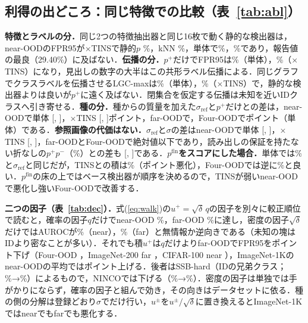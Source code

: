 \documentclass[MIRU,submit]{miru2025j}
\newcommand\eqnref[1]{式(\ref{eq:#1})}
\newcommand\AUC{AUROC}
\newcommand\FPR{FPR95}
\newcommand\pP{p^{+}}
\newcommand\pN{p^{-}}
\newcommand\pfin{p^{\mathrm{fin}}}
\newcommand\sR{\sigma_{\mathrm{ref}}}
\begin{document}
\subsection{利得の出どころ：同じ特徴での比較（表~\ref{tab:abl}）}
\label{sec:abl}
\textbf{特徴とラベルの分．}同じ2つの特徴抽出器と同じ16枚で動く静的な検出器は，near-OODの\FPR{}が$\times$TINSで静的$p$ \NAblXfitStaticPooledTinsNearFpr\%，kNN \NAblKnnTinsNearFpr\%，単体で\NAblXfitStaticPooledNoneNearFpr\%，\NAblKnnNoneNearFpr\%であり，報告値の最良（29.40\%）に及ばない．\textbf{伝播の分．}$\pP$だけで\FPR{}は\NRLpAloneNearFpr\%（単体），\NRLpTinsNearFpr\%（$\times$TINS）になり，見出しの数字の大半はこの共形ラベル伝播による．同じグラフでクラスラベルを伝播させるLGC-maxは\NAblLgcmaxNoneNearFpr\%（単体），\NAblLgcmaxTinsNearFpr\%（$\times$TINS）で，静的な検出器よりは良いが$\pP$に遠く及ばない．閉集合を仮定する伝播は未知を近いIDクラスへ引き寄せる．\textbf{種の分．}種からの質量を加えた$\sR$と$\pP$だけとの差は，near-OODで単体\NRvsLpAloneNearD{} [\NRvsLpAloneNearDLo, \NRvsLpAloneNearDHi]，$\times$TINS \NRvsLpTinsNearD{} [\NRvsLpTinsNearDLo, \NRvsLpTinsNearDHi]ポイント，far-OODで\NRvsLpAloneFarD{}，Four-OODで\NRvsLpAloneFourD{}ポイント（単体）である．\textbf{参照画像の代価はない．}$\sR$と$\sigma$の差はnear-OODで単体\NRAloneNearDSig{} [\NRAloneNearDSigLo, \NRAloneNearDSigHi]，$\times$TINS \NRTinsNearDSig{} [\NRTinsNearDSigLo, \NRTinsNearDSigHi]，far-OODとFour-OODで絶対値\NRDSigFarFourMaxAbs{}以下であり，読み出しの保証を持たない折なしの$\pP\pN$（\NRVOneAloneNearFpr\%）との差も\NRvsVOneAloneNearD{} [\NRvsVOneAloneNearDLo, \NRvsVOneAloneNearDHi]である．\textbf{$\pfin$をスコアにした場合．}単体では\NRPfAloneNearFpr\%と$\sR$と同じだが，TINSとの積は\NRPfTinsNearFpr\%（\NRPfTinsNearWorse{}ポイント悪化），Four-OODでは逆に\NRPfTinsFourFpr\%と良い．$\pfin$の床の上ではベース検出器が順序を決めるので，TINSが弱いnear-OODで悪化し強いFour-OODで改善する．

\textbf{二つの因子（表~\ref{tab:dec}）．}\eqnref{walk}の$u^{+}=\sqrt{\delta}\,q$の因子を別々に較正順位で読むと，確率の因子$q$だけでnear-OOD \NRDecQINNearFpr\%，far-OOD \NRDecQINFarFpr\%に達し，密度の因子$\sqrt{\delta}$だけでは\AUC{}が\NRDecDegINNearAuroc\%（near），\NRDecDegINFarAuroc\%（far）と無情報か逆向きである（未知の塊はIDより密なことが多い）．それでも積$u^{+}$は$q$だけよりfar-OODで\FPR{}を\NRDecUHelpsINFar{}ポイント下げ（Four-OOD \NRDecUHelpsFour{}，ImageNet-200 far \NRDecUHelpsITFar{}，CIFAR-100 near \NRDecUHelpsCFNear{}），ImageNet-1Kのnear-OODの平均では\NRDecUHurtsINNear{}ポイント上げる．後者はSSB-hard（IDの兄弟クラス；\NRDecQSsbHardFpr\%→\NRDecUSsbHardFpr\%）によるもので，NINCOでは下げる（\NRDecQNincoFpr\%→\NRDecUNincoFpr\%）．密度の因子は単独では手がかりにならず，確率の因子と組んで効き，その向きはデータセットに依る．種の側の分解は登録どおり$\sigma$でだけ行い，$u^{\pm}$を$u^{\pm}/\sqrt{\delta}$に置き換えるとImageNet-1Kではnearでもfarでも悪化する．
\end{document}
